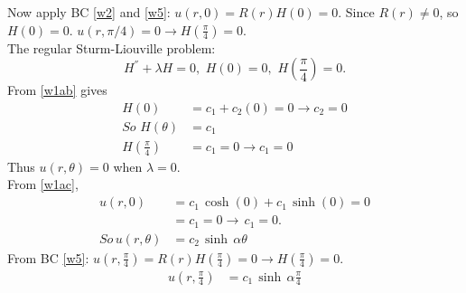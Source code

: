 Now apply BC \eqref{w2} and \eqref{w5}: $u(r,0)=R(r)H(0)=0$. Since $R(r)\neq 0$, so $H(0)=0$. $u(r,\pi/4)=0\to H(\frac{\pi}{4})=0$.\\
The regular Sturm-Liouville problem:\\
\begin{equation}
H^{''}+\lambda H=0,\,\,H(0)=0,\,\,H(\frac{\pi}{4})=0.\label{sv1}
\end{equation}
From \eqref{w1ab} gives
\begin{align}
H(0)&=c_1+c_2(0)=0\to c_2=0\nonumber\\
So\,\,H(\theta)&=c_1\\
H(\frac{\pi}{4})&=c_1=0\to c_1=0
\end{align}
Thus $u(r,\theta)=0$ when $\lambda=0$.\\
From \eqref{w1ac},
\begin{align}
u(r,0)&=c_1\,\cosh(0)+c_1\,\sinh(0)=0\nonumber\\
&=c_1=0\to\,c_1=0.\nonumber\\
So\, u(r,\theta)&=c_2\,\sinh\,\alpha\theta\label{sw1}
\end{align}
From BC \eqref{w5}: $u(r,\frac{\pi}{4})=R(r)H(\frac{\pi}{4})=0\to H(\frac{\pi}{4})=0$. %
\begin{align*}
u(r,\frac{\pi}{4})&=c_1\,\sinh\,\alpha\frac{\pi}{4}
\end{align*}


